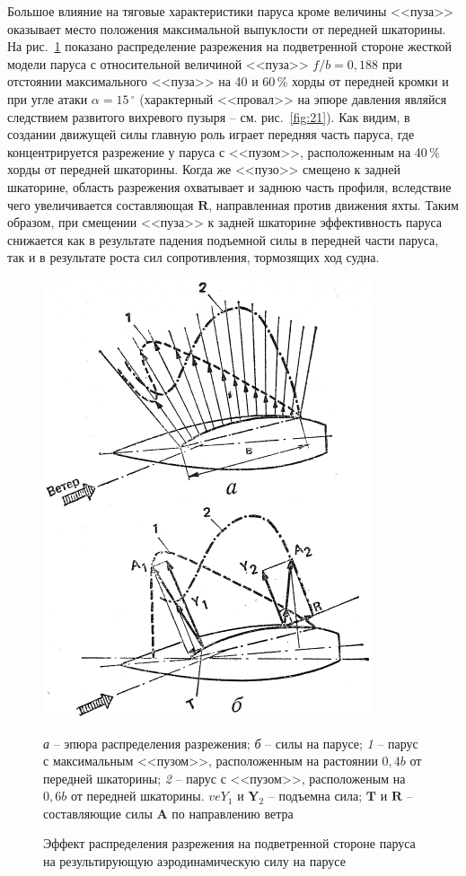 \documentclass[a4paper, 12pt, twoside, final, book, russian, fittopage, cyremdash]{ncc}
\newcommand{\ve}[1]{\ensuremath{\mathbf{#1}}\xspace}
\newcommand{\gr}{\ensuremath{\,^\circ}\xspace}
\newcommand{\ris}[1]{\ref{fig:#1}}
\begin{document}
Большое влияние на тяговые характеристики паруса кроме величины <<пуза>> оказывает место положения максимальной выпуклости от передней шкаторины. На рис.~\ris{27} показано распределение разрежения на подветренной стороне жесткой модели паруса с относительной величиной <<пуза>> $f/b = 0,188$ при отстоянии максимального <<пуза>> на 40 и 60\,\% хорды от передней кромки и при угле атаки $\alpha = 15\gr$ (характерный <<провал>> на эпюре давления являйся следствием развитого вихревого пузыря \--- см. рис.~\ris{21}). Как видим, в создании движущей силы главную роль играет передняя часть паруса, где концентрируется разрежение у паруса с <<пузом>>, расположенным на 40\,\% хорды от передней шкаторины. Когда же <<пузо>> смещено к задней шкаторине, область разрежения охватывает и заднюю часть профиля, вследствие чего увеличивается составляющая \ve R, направленная против движения яхты. Таким образом, при смещении <<пуза>> к задней шкаторине эффективность паруса снижается как в результате падения подъемной силы в передней части паруса, так и в результате роста сил сопротивления, тормозящих ход судна.

\begin{figure}[htb]
  \centering
  \includegraphics[scale=1.2]{0027P}
  \caption{Эффект распределения разрежения на подветренной стороне паруса на результирующую аэродинамическую силу на парусе}
  \label{fig:27}
  \small
  \centering{}
  \textit{а} \--- эпюра распределения разрежения; \textit{б} \--- силы на парусе; \textit{1} \--- парус с максимальным <<пузом>>, расположенным на растоянии $0,4 b$ от передней шкаторины; \textit{2} \--- парус с <<пузом>>, расположеным на $0,6 b$ от передней шкаторины. $ve Y_1$ и $\ve Y_2$ \--- подъемна сила; \ve T и \ve R \--- составляющие силы \ve A по направлению ветра
\end{figure}
\end{document}
